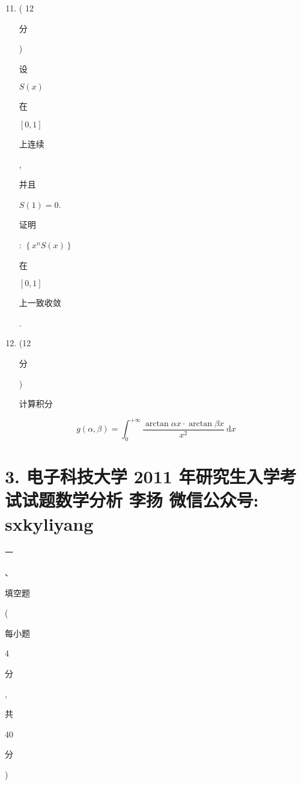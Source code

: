 \documentclass[10pt]{article}
\begin{document}
\begin{enumerate}
  \setcounter{enumi}{10}
  \item ( 12 \begin{CJK}{UTF8}{mj}分\end{CJK}) \begin{CJK}{UTF8}{mj}设\end{CJK} $S(x)$ \begin{CJK}{UTF8}{mj}在\end{CJK} $[0,1]$ \begin{CJK}{UTF8}{mj}上连续\end{CJK}, \begin{CJK}{UTF8}{mj}并且\end{CJK} $S(1)=0$. \begin{CJK}{UTF8}{mj}证明\end{CJK}: $\left\{x^{n} S(x)\right\}$ \begin{CJK}{UTF8}{mj}在\end{CJK} $[0,1]$ \begin{CJK}{UTF8}{mj}上一致收敛\end{CJK}.

  \item (12 \begin{CJK}{UTF8}{mj}分\end{CJK}) \begin{CJK}{UTF8}{mj}计算积分\end{CJK}

\end{enumerate}
$$
g(\alpha, \beta)=\int_{0}^{+\infty} \frac{\arctan \alpha x \cdot \arctan \beta x}{x^{2}} \mathrm{~d} x
$$

\section{3. 电子科技大学 2011 年研究生入学考试试题数学分析 
 李扬 
 微信公众号: sxkyliyang}
\begin{CJK}{UTF8}{mj}一\end{CJK}、\begin{CJK}{UTF8}{mj}填空题\end{CJK}(\begin{CJK}{UTF8}{mj}每小题\end{CJK} 4 \begin{CJK}{UTF8}{mj}分\end{CJK}, \begin{CJK}{UTF8}{mj}共\end{CJK} 40 \begin{CJK}{UTF8}{mj}分\end{CJK})
\end{document}
